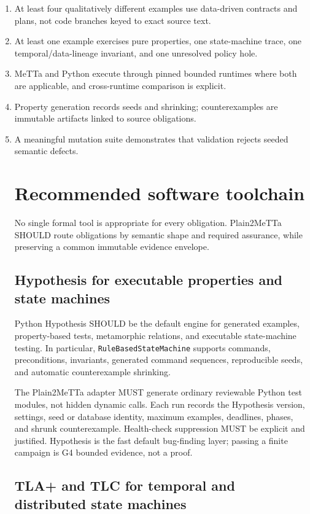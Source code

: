 \documentclass[10pt]{article}
\begin{document}
\begin{enumerate}
\item At least four qualitatively different examples use data-driven contracts
and plans, not code branches keyed to exact source text.
\item At least one example exercises pure properties, one state-machine trace,
one temporal/data-lineage invariant, and one unresolved policy hole.
\item MeTTa and Python execute through pinned bounded runtimes where both are
applicable, and cross-runtime comparison is explicit.
\item Property generation records seeds and shrinking; counterexamples are
immutable artifacts linked to source obligations.
\item A meaningful mutation suite demonstrates that validation rejects seeded
semantic defects.

\section{Recommended software toolchain}

No single formal tool is appropriate for every obligation.  Plain2MeTTa SHOULD
route obligations by semantic shape and required assurance, while preserving a
common immutable evidence envelope.

\subsection{Hypothesis for executable properties and state machines}

Python Hypothesis SHOULD be the default engine for generated examples,
property-based tests, metamorphic relations, and executable state-machine
testing.  In particular, \texttt{RuleBasedStateMachine} supports commands,
preconditions, invariants, generated command sequences, reproducible seeds,
and automatic counterexample shrinking.

The Plain2MeTTa adapter MUST generate ordinary reviewable Python test modules,
not hidden dynamic calls.  Each run records the Hypothesis version, settings,
seed or database identity, maximum examples, deadlines, phases, and shrunk
counterexample.  Health-check suppression MUST be explicit and justified.
Hypothesis is the fast default bug-finding layer; passing a finite campaign is
G4 bounded evidence, not a proof.

\subsection{TLA+ and TLC for temporal and distributed state machines}


\end{enumerate}
\end{document}
